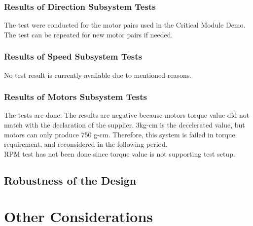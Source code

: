 \documentclass[a4paper,12pt]{article}
\begin{document}
	
	
	
	
	
	
	
	
	\subsubsection*{Results of Direction Subsystem Tests}
		
		The test were conducted for the motor pairs used in the Critical Module Demo. The test can be repeated for new motor pairs if needed.
	
	
	
	
	
	
	
	
	
	
	\subsubsection*{Results of Speed Subsystem Tests}
	No test result is currently available due to mentioned reasons.

	
	
	 
	
	 
	
	
	\subsubsection*{Results of Motors Subsystem Tests}
	The tests are done. The results are negative because motors torque value did not match with the declaration of the supplier. 3kg-cm is the decelerated value, but motors can only produce 750 g-cm. Therefore, this system is failed in torque requirement, and reconsidered in the following period. \\

		
	
	RPM test has not been done since torque value is not supporting test setup.
	
	
	 
	 
	
	
	
	\subsection{Robustness of the Design}
	
	
	
	
	
	
	
	
	\section{Other Considerations}
\end{document}
